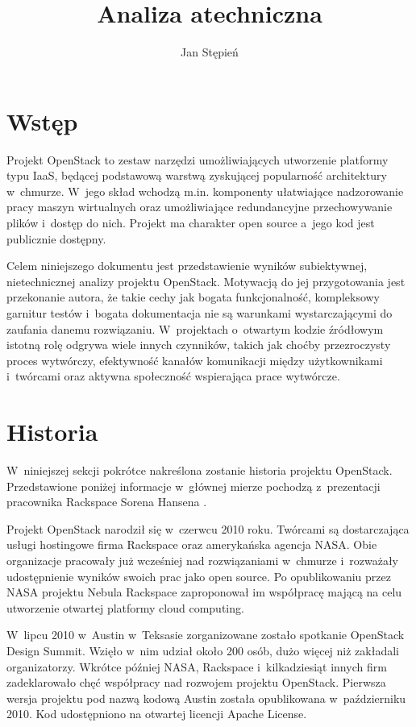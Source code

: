 \documentclass[a4paper,12pt]{article}
\title{Analiza atechniczna}
\author{Jan Stępień}
\begin{document}
	\maketitle

	\section{Wstęp}

	Projekt OpenStack to zestaw narzędzi umożliwiających utworzenie platformy
	typu IaaS, będącej podstawową warstwą zyskującej popularność architektury
	w~chmurze. W~jego skład wchodzą m.in. komponenty ułatwiające nadzorowanie
	pracy maszyn wirtualnych oraz umożliwiające redundancyjne przechowywanie
	plików i~dostęp do nich. Projekt ma charakter open source a~jego kod jest
	publicznie dostępny.

	Celem niniejszego dokumentu jest przedstawienie wyników subiektywnej,
	nietechnicznej analizy projektu OpenStack. Motywacją do jej przygotowania
	jest przekonanie autora, że takie cechy jak bogata funkcjonalność,
	kompleksowy garnitur testów i~bogata dokumentacja nie są warunkami
	wystarczającymi do zaufania danemu rozwiązaniu. W~projektach o~otwartym
	kodzie źródłowym istotną rolę odgrywa wiele innych czynników, takich jak
	choćby przezroczysty proces wytwórczy, efektywność kanałów komunikacji
	między użytkownikami i~twórcami oraz aktywna społeczność wspierająca prace
	wytwórcze.

	\section{Historia}

	W~niniejszej sekcji pokrótce nakreślona zostanie historia projektu
	OpenStack. Przedstawione poniżej informacje w~głównej mierze pochodzą
	z~prezentacji pracownika Rackspace Sorena Hansena \cite{hansen11}.

	Projekt OpenStack narodził się w~czerwcu 2010 roku. Twórcami są
	dostarczająca usługi hostingowe firma Rackspace oraz amerykańska agencja
	NASA. Obie organizacje pracowały już wcześniej nad rozwiązaniami w~chmurze
	i~rozważały udostępnienie wyników swoich prac jako open source. Po
	opublikowaniu przez NASA projektu Nebula Rackspace zaproponował im
	współpracę mającą na celu utworzenie otwartej platformy cloud computing.

	W~lipcu 2010 w~Austin w~Teksasie zorganizowane zostało spotkanie OpenStack
	Design Summit. Wzięło w~nim udział około 200 osób, dużo więcej niż
	zakładali organizatorzy. Wkrótce później NASA, Rackspace i~kilkadziesiąt
	innych firm zadeklarowało chęć współpracy nad rozwojem projektu OpenStack.
	Pierwsza wersja projektu pod nazwą kodową Austin została opublikowana
	w~październiku 2010. Kod udostępniono na otwartej licencji Apache License.
\end{document}
